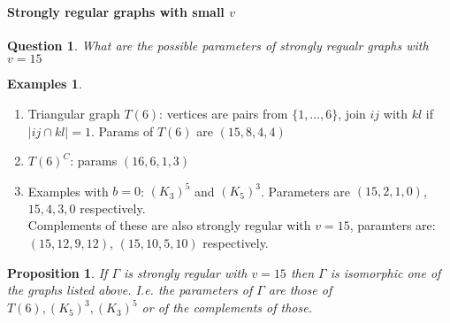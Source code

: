 \documentclass[]{article}
\newtheorem{prop}[thm]{Proposition}
\newtheorem*{quest}{Question}
\theoremstyle{definition}
\newtheorem*{exmps}{Examples}
\theoremstyle{remark}
\numberwithin{equation}{section}
\begin{document}
			\paragraph{Strongly regular graphs with small $v$}
				\begin{quest} What are the possible parameters of strongly regualr graphs with $v = 15$
				\end{quest}
				\begin{exmps}
					\begin{enumerate}
						\item Triangular graph $T(6)$: vertices are pairs from $\{1,\hdots, 6\}$, join $ij$ with $kl$ if $|ij \cap kl| = 1$. Params of $T(6)$ are $(15, 8, 4, 4)$
						\item $T(6)^C$: params $(16, 6, 1, 3)$
						\item Examples with $b= 0$: $(K_3)^5$ and $(K_5)^3$. Parameters are $(15, 2, 1, 0)$, $15, 4, 3, 0$ respectively.\\
						Complements of these are also strongly regular with $v = 15$, paramters are: $(15, 12, 9 ,12)$, $(15,10, 5, 10)$ respectively.
					\end{enumerate}
				\end{exmps}
				\begin{prop}
					If $\Gamma$ is strongly regular with $v = 15$ then $\Gamma$ is isomorphic one of the graphs listed above. I.e. the parameters of $\Gamma$ are those of $T(6), (K_5)^3, (K_3)^5$ or of the complements of those.
				\end{prop}
\end{document}
